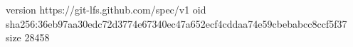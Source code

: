 version https://git-lfs.github.com/spec/v1
oid sha256:36eb97aa30edc72d3774e67340ec47a652ecf4cddaa74e59cbebabcc8ccf5f37
size 28458
